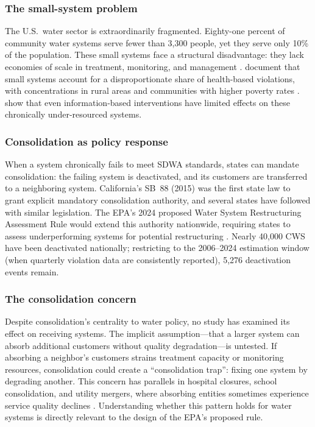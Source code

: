 \documentclass[12pt]{article}
\begin{document}
\subsubsection*{The small-system problem} The U.S.\ water sector is extraordinarily fragmented. Eighty-one percent of community water systems serve fewer than 3,300 people, yet they serve only 10\% of the population. These small systems face a structural disadvantage: they lack economies of scale in treatment, monitoring, and management \citep{olmstead2004informing}. \citet{allaire2018national} document that small systems account for a disproportionate share of health-based violations, with concentrations in rural areas and communities with higher poverty rates \citep{balazs2011environmental}. \citet{bennear2009impact} show that even information-based interventions have limited effects on these chronically under-resourced systems.

\subsubsection*{Consolidation as policy response} When a system chronically fails to meet SDWA standards, states can mandate consolidation: the failing system is deactivated, and its customers are transferred to a neighboring system. California's SB~88 (2015) was the first state law to grant explicit mandatory consolidation authority, and several states have followed with similar legislation. The EPA's 2024 proposed Water System Restructuring Assessment Rule would extend this authority nationwide, requiring states to assess underperforming systems for potential restructuring \citep{epa2024restructuring}. Nearly 40,000 CWS have been deactivated nationally; restricting to the 2006--2024 estimation window (when quarterly violation data are consistently reported), 5,276 deactivation events remain.

\subsubsection*{The consolidation concern} Despite consolidation's centrality to water policy, no study has examined its effect on receiving systems. The implicit assumption---that a larger system can absorb additional customers without quality degradation---is untested. If absorbing a neighbor's customers strains treatment capacity or monitoring resources, consolidation could create a ``consolidation trap'': fixing one system by degrading another. This concern has parallels in hospital closures, school consolidation, and utility mergers, where absorbing entities sometimes experience service quality declines \citep{duflo2004regulation}. Understanding whether this pattern holds for water systems is directly relevant to the design of the EPA's proposed rule.
\end{document}

